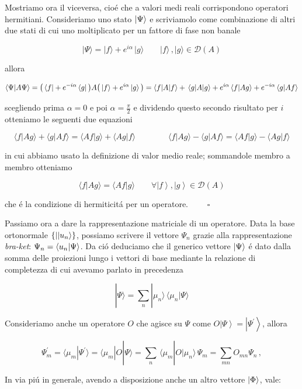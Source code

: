 \begin{enumerate}
	Mostriamo ora il viceversa, cio\'e che a valori medi reali corrispondono operatori hermitiani. Consideriamo uno stato $\ket{\Psi}$ e scriviamolo come combinazione di altri due stati di cui uno moltiplicato per un fattore di fase non banale
	
	$$|\Psi\rangle=|f\rangle+e^{i\alpha}\,|g\rangle\qquad|f\rangle\,,|g\rangle\in{\mathcal{D}}(A)$$
	
	allora
	
	$$\langle\Psi|A\Psi\rangle=\big{(}\,\langle f|+e^{-i\alpha}\,\langle g|\,\big{)}A\big{(}\,|f\rangle+e^{i\alpha}\,|g\rangle\,\big{)}=\langle f|A|f\rangle+\,\langle g|A|g\rangle+e^{i\alpha}\,\langle f|Ag\rangle+e^{-i\alpha}\,\langle g|Af\rangle$$
	
	scegliendo prima $\alpha = 0$ e poi $\alpha = \frac{\pi}{2}$ e dividendo questo secondo risultato per $i$ otteniamo le seguenti due equazioni
	
	$$\langle f|A g\rangle+\langle g|A f\rangle=\langle A f|g\rangle+\langle A g|f\rangle \qquad\qquad \langle f|A g\rangle-\langle g|A f\rangle=\langle A f|g\rangle-\langle A g|f\rangle$$
	
	in cui abbiamo usato la definizione di valor medio reale; sommandole membro a membro otteniamo
	
	$$\langle f|A g\rangle=\langle A f|g\rangle\qquad\forall\left|f\right\rangle,\left|g\right\rangle\in{\mathcal{D}}(A)$$
	
	che \'e la condizione di hermiticit\'a per un operatore. $\qquad\square$
\end{enumerate}

Passiamo ora a dare la rappresentazione matriciale di un operatore. Data la base ortonormale $\{|\ket{u_n}\}$, possiamo scrivere il vettore $\Psi_n$ grazie alla rappresentazione \textit{bra-ket}: $\Psi_n = \braket{u_n}{\Psi}$. Da ci\'o deduciamo che il generico vettore $\ket{\Psi}$ \'e dato dalla somma delle proiezioni lungo i vettori di base mediante la relazione di completezza di cui avevamo parlato in precedenza

$$|\Psi\rangle=\sum_{n}|\mu_{n}\rangle\,\langle\mu_{n}|\Psi\rangle$$

Consideriamo anche un operatore $O$ che agisce su $\Psi$ come $O\left|\Psi\right\rangle=\left|\Psi^{\prime}\right\rangle$, allora

$$\Psi_{m}^{\prime}=\langle\mu_{m}|\Psi^{\prime}\rangle=\langle\mu_{m}|O|\Psi\rangle=\sum_{n}\,\langle\mu_{m}|O|\mu_{n}\rangle\,\Psi_{m}=\sum_{m n}O_{m n}\Psi_{n}\,,$$

In via pi\'u in generale, avendo a disposizione anche un altro vettore $\ket{\Phi}$, vale:

